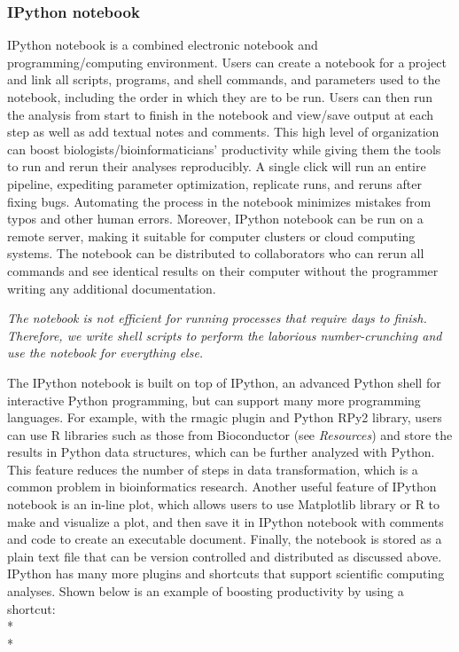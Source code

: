\documentclass[ChapterTOCs,krantz2]{krantz} %
\begin{document}
\subsubsection{IPython notebook}

IPython notebook is a combined
electronic notebook and programming/computing environment.  
Users can create a notebook for a project and link all scripts,
programs, and shell commands, and parameters used to the notebook, including
the order in which they are to be run.  Users can then run the analysis from start to
finish in the notebook and view/save output at each step as well as add textual
notes and comments.   This high level of organization can boost
biologists/bioinformaticians' productivity while giving them the tools to run
and rerun their analyses reproducibly.  A single click will run an entire
pipeline, expediting parameter optimization, replicate runs, and reruns after
fixing bugs.  Automating the process in the notebook minimizes mistakes from
typos and other human errors.  Moreover, IPython notebook can be run on a
remote server, making it suitable for computer clusters or
cloud computing systems. The notebook can be distributed to
collaborators who can rerun all commands and see identical results on their
computer without the programmer writing any additional documentation.

\textsl{The notebook is not efficient
for running processes that require days to finish.  Therefore, we write
shell scripts to perform the laborious number-crunching and use the notebook
for everything else.}

The IPython notebook is built on top of IPython, an advanced Python shell for
interactive Python programming, but can support many more programming
languages.
For example, with the rmagic plugin and Python RPy2 library, users can
use R libraries such as those from Bioconductor (see \emph{Resources})
and store the results in Python data structures, which can be further analyzed 
with Python.
This feature reduces the number of steps in
data transformation, which is a common problem in
bioinformatics research.
Another useful feature of IPython notebook is an in-line plot, which allows
users to use Matplotlib library or R to make and visualize a plot, and then save it
in IPython notebook with comments and code to create an executable document.
Finally, the notebook is stored as a plain text file that can be version controlled
and distributed as discussed above.
IPython has many more plugins and shortcuts that support scientific
computing analyses.
Shown below is an example of boosting productivity by using a shortcut:\\*\\*
\end{document}
